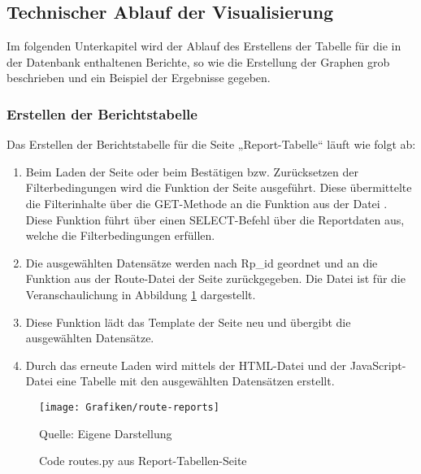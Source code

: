 \subsection{Technischer Ablauf der Visualisierung}
\label{subsec:technische-details-zur-visualisierung}


Im folgenden Unterkapitel wird der Ablauf des Erstellens der Tabelle für die in der Datenbank enthaltenen Berichte, so wie die
Erstellung der Graphen grob beschrieben und ein Beispiel der Ergebnisse gegeben.

\subsubsection{Erstellen der Berichtstabelle}

Das Erstellen der Berichtstabelle für die Seite „Report-Tabelle“ läuft wie folgt ab:

\begin{enumerate}

    \item Beim Laden der Seite oder beim Bestätigen bzw. Zurücksetzen der Filterbedingungen wird die Funktion  der Seite ausgeführt.
    Diese übermittelte die Filterinhalte über die GET-Methode an die Funktion  aus der Datei .
    Diese Funktion führt über  einen SELECT-Befehl über die Reportdaten aus, welche die Filterbedingungen erfüllen.
    \item Die ausgewählten Datensätze werden nach Rp\_id geordnet und an die Funktion  aus der Route-Datei der Seite zurückgegeben.
    Die Datei  ist für die Veranschaulichung in Abbildung \ref{fig:Code routes.py aus Report-Tabellen-Seite} dargestellt.
    \item Diese Funktion lädt das Template der Seite neu und übergibt die ausgewählten Datensätze.
    \item Durch das erneute Laden wird mittels der HTML-Datei  und der JavaScript-Datei  eine Tabelle mit den
    ausgewählten Datensätzen erstellt.

\end{enumerate}

\begin{figure}[H]
    \centering
    \texttt{[image: Grafiken/route-reports]}
    \caption{Code routes.py aus Report-Tabellen-Seite}
    \label{fig:Code routes.py aus Report-Tabellen-Seite}
    {Quelle: Eigene Darstellung}
\end{figure}

